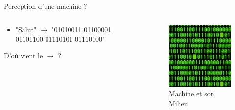 \documentclass{beamer}
\begin{document}
\begin{frame}{Perception d'une machine ?}
\begin{columns}
\begin{column}{0.5\textwidth}
\begin{block}{}
 
\begin{itemize}
    \item "Salut" $\to$ "01010011 01100001 01101100 01110101 01110100"
\end{itemize}
D'où vient le $\to$ ?

\end{block}
\end{column}
\begin{column}{0.6\textwidth}
\begin{block}{}
\begin{figure}
    \centering
    \includegraphics[width=\textwidth]{Machine_language.jpeg}
    \caption{Machine et son Milieu}
    \label{fig:synapto}
\end{figure}
\end{block}
\end{column}
\end{columns}
\end{frame}
\end{document}
